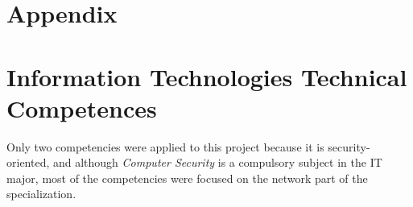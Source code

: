 \section*{Appendix} 
\label{sec:appendix}
%
%
%




\section{Information Technologies Technical Competences}
Only two competencies were applied to this project because it is security-oriented, and although \textit{Computer Security} is a compulsory subject in the IT major, most of the competencies were focused on the network part of the specialization.


